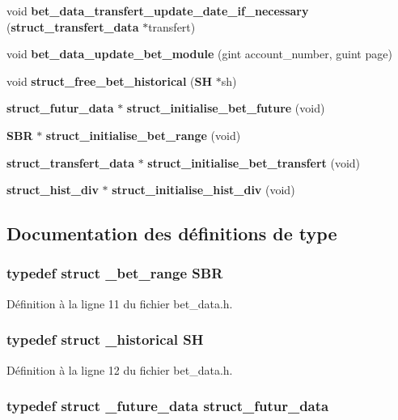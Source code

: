 \begin{DoxyCompactItemize}
\item 
void {\bf bet\_\-data\_\-transfert\_\-update\_\-date\_\-if\_\-necessary} ({\bf struct\_\-transfert\_\-data} $\ast$transfert)
\item 
void {\bf bet\_\-data\_\-update\_\-bet\_\-module} (gint account\_\-number, guint page)
\item 
void {\bf struct\_\-free\_\-bet\_\-historical} ({\bf SH} $\ast$sh)
\item 
{\bf struct\_\-futur\_\-data} $\ast$ {\bf struct\_\-initialise\_\-bet\_\-future} (void)
\item 
{\bf SBR} $\ast$ {\bf struct\_\-initialise\_\-bet\_\-range} (void)
\item 
{\bf struct\_\-transfert\_\-data} $\ast$ {\bf struct\_\-initialise\_\-bet\_\-transfert} (void)
\item 
{\bf struct\_\-hist\_\-div} $\ast$ {\bf struct\_\-initialise\_\-hist\_\-div} (void)
\end{DoxyCompactItemize}


\subsection{Documentation des définitions de type}
\subsubsection[{SBR}]{\setlength{\rightskip}{0pt plus 5cm}typedef struct {\bf \_\-bet\_\-range} {\bf SBR}}\label{bet__data_8h_a64ea101cce8cc47efd206cf10c729b0a}


Définition à la ligne 11 du fichier bet\_\-data.h.

\subsubsection[{SH}]{\setlength{\rightskip}{0pt plus 5cm}typedef struct {\bf \_\-historical} {\bf SH}}\label{bet__data_8h_af44a48e75280e6f4b4effa21972e619f}


Définition à la ligne 12 du fichier bet\_\-data.h.

\subsubsection[{struct\_\-futur\_\-data}]{\setlength{\rightskip}{0pt plus 5cm}typedef struct {\bf \_\-future\_\-data} {\bf struct\_\-futur\_\-data}}\label{bet__data_8h_a8796fb2765c00bc3a62e126284007484}


